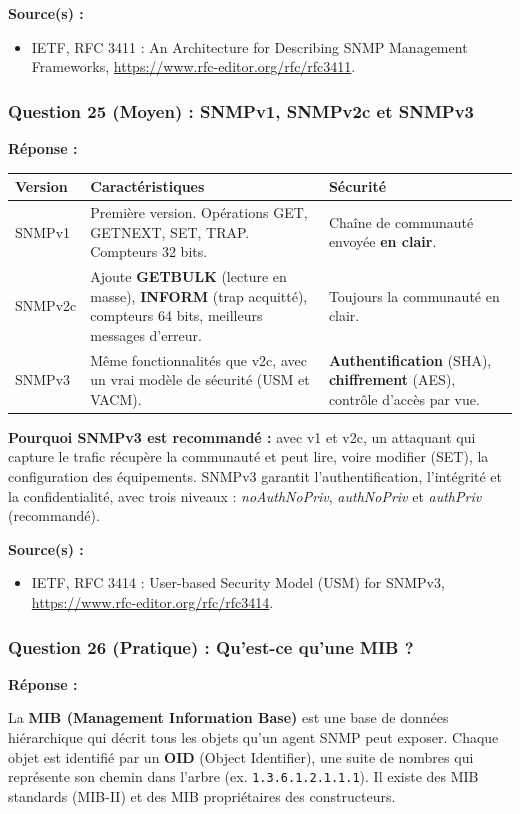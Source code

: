 \documentclass[12pt,a4paper]{article}
\newcommand{\reponse}{\textbf{Réponse :}\par}
\newcommand{\sources}{\textbf{Source(s) :}}
\begin{document}
\sources
\begin{itemize}
    \item IETF, RFC 3411 : An Architecture for Describing SNMP
    Management Frameworks, \url{https://www.rfc-editor.org/rfc/rfc3411}.
\end{itemize}

\subsubsection*{Question 25 (Moyen) : SNMPv1, SNMPv2c et SNMPv3}

\reponse
\begin{longtable}{|L{2.4cm}|L{6cm}|L{6.2cm}|}
\hline
\textbf{Version} & \textbf{Caractéristiques} & \textbf{Sécurité} \\ \hline
\endhead
SNMPv1 & Première version. Opérations GET, GETNEXT, SET, TRAP. Compteurs
32 bits. & Chaîne de communauté envoyée \textbf{en clair}. \\ \hline
SNMPv2c & Ajoute \textbf{GETBULK} (lecture en masse), \textbf{INFORM}
(trap acquitté), compteurs 64 bits, meilleurs messages d'erreur. &
Toujours la communauté en clair. \\ \hline
SNMPv3 & Même fonctionnalités que v2c, avec un vrai modèle de sécurité
(USM et VACM). & \textbf{Authentification} (SHA), \textbf{chiffrement}
(AES), contrôle d'accès par vue. \\ \hline
\end{longtable}

\textbf{Pourquoi SNMPv3 est recommandé :} avec v1 et v2c, un attaquant
qui capture le trafic récupère la communauté et peut lire, voire
modifier (SET), la configuration des équipements. SNMPv3 garantit
l'authentification, l'intégrité et la confidentialité, avec trois
niveaux : \textit{noAuthNoPriv}, \textit{authNoPriv} et
\textit{authPriv} (recommandé).

\sources
\begin{itemize}
    \item IETF, RFC 3414 : User-based Security Model (USM) for SNMPv3,
    \url{https://www.rfc-editor.org/rfc/rfc3414}.
\end{itemize}

\subsubsection*{Question 26 (Pratique) : Qu'est-ce qu'une MIB ?}

\reponse
La \textbf{MIB (Management Information Base)} est une base de données
hiérarchique qui décrit tous les objets qu'un agent SNMP peut exposer.
Chaque objet est identifié par un \textbf{OID} (Object Identifier),
une suite de nombres qui représente son chemin dans l'arbre (ex.
\texttt{1.3.6.1.2.1.1.1}). Il existe des MIB standards (MIB-II) et des
MIB propriétaires des constructeurs.
\end{document}
